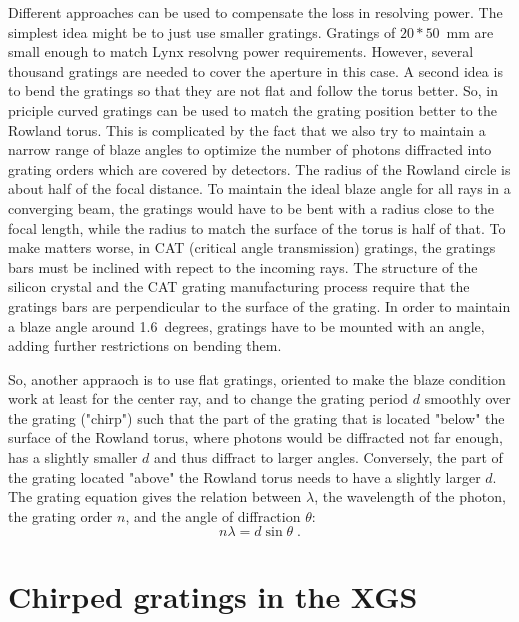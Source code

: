 \documentclass[]{spie}  %
\begin{document}
Different approaches can be used to compensate the loss in resolving power. The simplest idea might be to just use smaller gratings. Gratings of $20*50$~mm are small enough to match Lynx resolvng power requirements\cite{CATXGS}. However, several thousand gratings are needed to cover the aperture in this case. A second idea is to bend the gratings so that they are not flat and follow the torus better. So, in priciple curved gratings can be used to match the grating position better to the Rowland torus. This is complicated by the fact that we also try to maintain a narrow range of blaze angles to optimize the number of photons diffracted into grating orders which are covered by detectors. The radius of the Rowland circle is about half of the focal distance. To maintain the ideal blaze angle for all rays in a converging beam, the gratings would have to be bent with a radius close to the focal length, while the radius to match the surface of the torus is half of that. To make matters worse, in CAT (critical angle transmission) gratings, the gratings bars must be inclined with repect to the incoming rays. The structure of the silicon crystal and the CAT grating manufacturing process require that the gratings bars are perpendicular to the surface of the grating. In order to maintain a blaze angle around 1.6~degrees, gratings have to be mounted with an angle, adding further restrictions on bending them.

So, another appraoch is to use flat gratings, oriented to make the blaze condition work at least for the center ray, and to change the grating period $d$ smoothly over the grating ("chirp") such that the part of the grating that is located "below" the surface of the Rowland torus, where photons would be diffracted not far enough, has a slightly smaller $d$ and thus diffract to larger angles. Conversely, the part of the grating located "above" the Rowland torus needs to have a slightly larger $d$. The grating equation gives the relation between $\lambda$, the wavelength of the photon, the grating order $n$, and the angle of diffraction $\theta$:
$$
n\lambda = d \sin \theta \; .
$$

\section{Chirped gratings in the XGS}
\label{sect:chrip}
\end{document}
